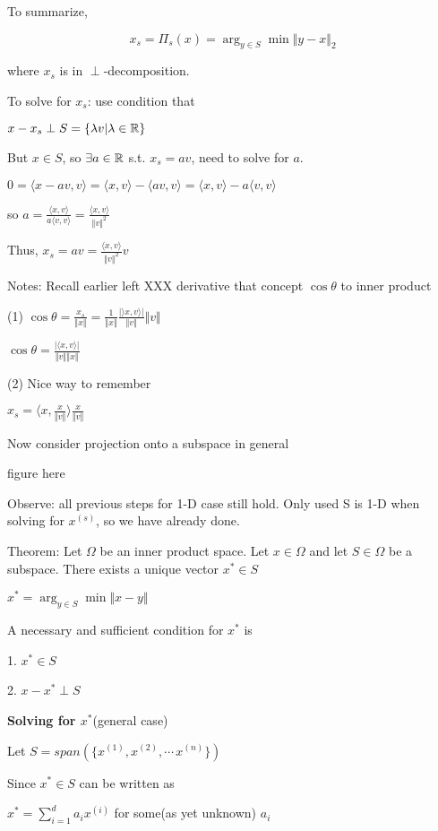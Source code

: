 To summarize,

$$x_{s}=\Pi_{s}(x)=\arg_{y\in S} \min \Vert y-x\Vert_{2}$$

where $x_{s}$ is in $\perp$-decomposition.

To solve for $x_{s}$: use condition that

$x-x_{s} \perp S=\{\lambda v|\lambda\in\mathbb{R}\}$

But $x\in S$, so $\exists a\in\mathbb{R}$ s.t. $x_{s}=av$, need to solve for $a$.

$0=\langle x-av,v\rangle=\langle x,v\rangle-\langle av,v\rangle=\langle x,v\rangle-a\langle v,v\rangle$

so $a=\frac{\langle x,v\rangle}{a\langle v,v\rangle}=\frac{\langle x,v\rangle}{\Vert v\Vert^{2}}$

Thus, $x_{s}=av=\frac{\langle x,v\rangle}{\Vert v\Vert^{2}}v$

Notes: Recall earlier left XXX derivative that concept $\cos\theta$ to inner product

(1) $\cos\theta=\frac{x_{s}}{\Vert x\Vert}=\frac{1}{\Vert x\Vert}\frac{\vert\rangle x,v\rangle\vert}{\Vert v\Vert}\Vert v\Vert$

$\cos\theta = \frac{\vert\langle x,v\rangle\vert}{\Vert v\Vert\Vert x\Vert}$

(2) Nice way to remember

$x_{s}=\langle x,\frac{x}{\Vert v\Vert}\rangle \frac{x}{\Vert v\Vert}$

Now consider projection onto a subspace in general

figure here

Observe: all previous steps for 1-D case still hold. Only used S is 1-D when solving for $x^{(s)}$, so we have already done.

Theorem: Let $\Omega$ be an inner product space. Let $x\in\Omega$ and let $S\in\Omega$ be a subspace. There exists a unique vector $x^{*}\in S$

$x^{*} = \arg_{y\in S}\min \Vert x-y\Vert$

A necessary and sufficient condition for $x^{*}$ is

1. $x^{*} \in S$

2. $x-x^{*}\perp S$


\noindent\textbf{Solving for $x^{*}$}(general case)

Let $S=span\left(\{x^{(1)},x^{(2)},\cdots\,x^{(n)}\}\right)$

Since $x^{*}\in S$ can be written as 

$x^{*}=\sum_{i=1}^{d}a_{i}x^{(i)}$ for some(as yet unknown) $a_{i}$

